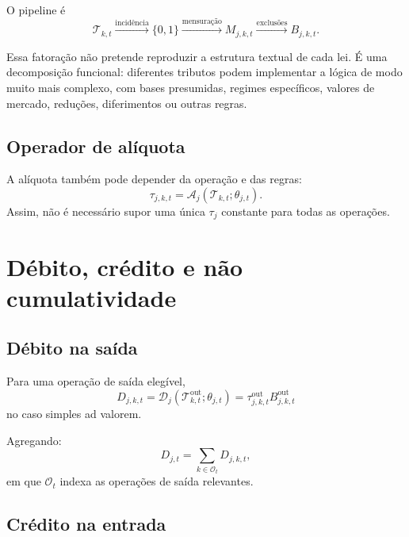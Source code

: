 \documentclass[11pt,a4paper]{article}
\newcommand{\cT}{\mathcal{T}}
\newcommand{\cA}{\mathcal{A}}
\newcommand{\cD}{\mathcal{D}}
\begin{document}
O pipeline é
\[
\cT_{k,t}
\xrightarrow{\text{incidência}}
\{0,1\}
\xrightarrow{\text{mensuração}}
M_{j,k,t}
\xrightarrow{\text{exclusões}}
B_{j,k,t}.
\]

\begin{cuidado}
Essa fatoração não pretende reproduzir a estrutura textual de cada lei. É uma decomposição funcional: diferentes tributos podem implementar a lógica de modo muito mais complexo, com bases presumidas, regimes específicos, valores de mercado, reduções, diferimentos ou outras regras.
\end{cuidado}

\subsection{Operador de alíquota}

A alíquota também pode depender da operação e das regras:
\begin{equation}
\boxed{\tau_{j,k,t}=\cA_j(\cT_{k,t};\theta_{j,t}).}
\label{eq:aliq-op}
\end{equation}
Assim, não é necessário supor uma única $\tau_j$ constante para todas as operações.

\section{Débito, crédito e não cumulatividade}

\subsection{Débito na saída}

Para uma operação de saída elegível,
\begin{equation}
\boxed{D_{j,k,t}=\cD_j(\cT^{\mathrm{out}}_{k,t};\theta_{j,t})
=\tau_{j,k,t}^{\mathrm{out}}B_{j,k,t}^{\mathrm{out}}}
\label{eq:debit}
\end{equation}
no caso simples ad valorem.

Agregando:
\begin{equation}
\boxed{D_{j,t}=\sum_{k\in\mathcal O_t}D_{j,k,t},}
\end{equation}
em que $\mathcal O_t$ indexa as operações de saída relevantes.

\subsection{Crédito na entrada}
\end{document}
